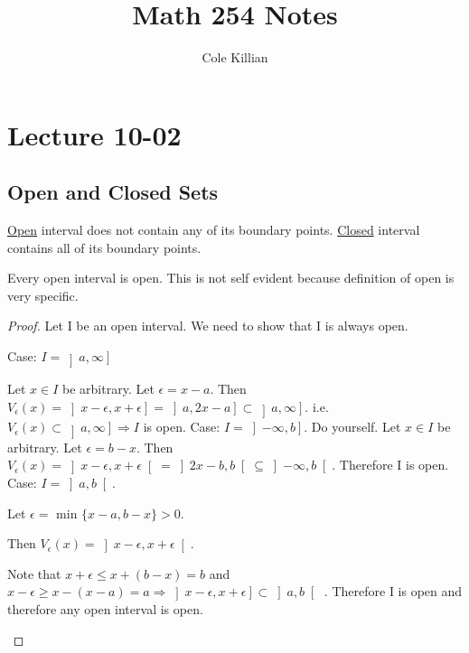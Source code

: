 \documentclass[class=scrartcl, crop=false]{standalone}
\begin{document}
\title{Math 254 Notes}
\author{Cole Killian}

\section{Lecture 10-02}

\subsection{Open and Closed Sets}

\begin{definition}
  \ul{Open} interval does not contain any of its boundary points.
  \ul{Closed} interval contains all of its boundary points.
\end{definition}

\begin{theorem}
  Every open interval is open. This is not self evident because definition of open is very specific.
  \begin{proof}Let I be an open interval. We need to show that I is always open.
    \begin{enumerate}
      \ii
      Case: $I = \left]a, \infty \right]$

      Let $x \in I$ be arbitrary. Let $\epsilon = x - a$. Then $V_\epsilon(x) = \left]x - \epsilon, x + \epsilon\right] = \left]a, 2x - a\right] \subset \left]a, \infty\right]$. i.e. $V_\epsilon(x) \subset \left]a, \infty\right] \Rightarrow I$ is open.
      \ii
      Case: $I = \left]-\infty, b\right]$. Do yourself. Let $x \in I$ be arbitrary. Let $\epsilon = b - x$. Then $V_\epsilon(x) = \left]x - \epsilon, x + \epsilon\right[ = \left]2x - b, b\right[ \subseteq \left]-\infty, b\right[$. Therefore I is open.
      \ii
      Case: $I = \left]a, b\right[$.

      Let  $\epsilon = $ min $\{x - a, b - x\} > 0$.

      Then $V_\epsilon(x) = \left]x - \epsilon, x + \epsilon\right[$.

      Note that $x + \epsilon \leq x + (b - x) = b$ and $x - \epsilon \geq x - (x - a) = a \Rightarrow \left]x - \epsilon, x + \epsilon\right] \subset \left]a, b\right[$ . Therefore I is open and therefore any open interval is open.
    \end{enumerate}
  \end{proof}
\end{theorem}
\end{document}
